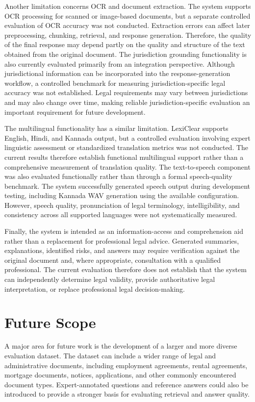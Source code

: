 \documentclass[12pt,a4paper,oneside]{report}
\begin{document}
Another limitation concerns OCR and document extraction. The system supports OCR processing for scanned or image-based documents, but a separate controlled evaluation of OCR accuracy was not conducted. Extraction errors can affect later preprocessing, chunking, retrieval, and response generation. Therefore, the quality of the final response may depend partly on the quality and structure of the text obtained from the original document. The jurisdiction grounding functionality is also currently evaluated primarily from an integration perspective. Although jurisdictional information can be incorporated into the response-generation workflow, a controlled benchmark for measuring jurisdiction-specific legal accuracy was not established. Legal requirements may vary between jurisdictions and may also change over time, making reliable jurisdiction-specific evaluation an important requirement for future development.

The multilingual functionality has a similar limitation. LexiClear supports English, Hindi, and Kannada output, but a controlled evaluation involving expert linguistic assessment or standardized translation metrics was not conducted. The current results therefore establish functional multilingual support rather than a comprehensive measurement of translation quality. The text-to-speech component was also evaluated functionally rather than through a formal speech-quality benchmark. The system successfully generated speech output during development testing, including Kannada WAV generation using the available configuration. However, speech quality, pronunciation of legal terminology, intelligibility, and consistency across all supported languages were not systematically measured.

Finally, the system is intended as an information-access and comprehension aid rather than a replacement for professional legal advice. Generated summaries, explanations, identified risks, and answers may require verification against the original document and, where appropriate, consultation with a qualified professional. The current evaluation therefore does not establish that the system can independently determine legal validity, provide authoritative legal interpretation, or replace professional legal decision-making.

\section{Future Scope}

A major area for future work is the development of a larger and more diverse evaluation dataset. The dataset can include a wider range of legal and administrative documents, including employment agreements, rental agreements, mortgage documents, notices, applications, and other commonly encountered document types. Expert-annotated questions and reference answers could also be introduced to provide a stronger basis for evaluating retrieval and answer quality.
\end{document}
